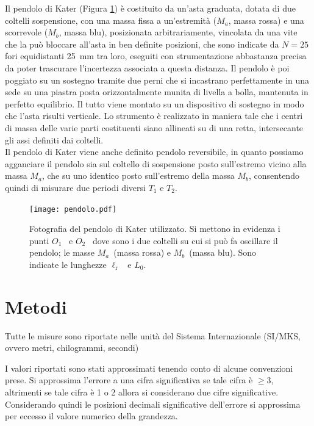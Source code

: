 \documentclass[italian, a4paper, 10pt, twocolumn]{../../style/lab_unige}
\newcommand{\reffig}[1]{Figura {\ref{#1}}}%
\newcommand{\Oi}{$O_1$}
\newcommand{\Oii}{$O_2$}
\newcommand{\lr}{$\ell_{\text{r}}$}
\newcommand{\Ti}[1]{$T_{#1}$}
\newcommand{\Ma}{$M_a$}
\newcommand{\Mb}{$M_b$}
\begin{document}
    Il pendolo di Kater (\reffig{figure:pendolo}) è costituito da un'asta graduata, dotata di due coltelli sospensione, con una massa fissa a un'estremità (\Ma, massa rossa) e una scorrevole (\Mb, massa blu), posizionata arbitrariamente, vincolata da una vite che la può bloccare all'asta in ben definite posizioni, che sono indicate da $N=25$ fori equidistanti 25~mm tra loro, eseguiti con strumentazione abbastanza precisa da poter trascurare l'incertezza associata a questa distanza. Il pendolo è poi poggiato su un sostegno tramite due perni che si incastrano perfettamente in una sede su una piastra posta orizzontalmente munita di livella a bolla, mantenuta in perfetto equilibrio. Il tutto viene montato su un dispositivo di sostegno in modo che l'asta risulti verticale. Lo strumento è realizzato in maniera tale che i centri di massa delle varie parti costituenti siano allineati su di una retta, intersecante gli assi definiti dai coltelli.\\
    Il pendolo di Kater viene anche definito pendolo reversibile, in quanto possiamo agganciare il pendolo sia sul coltello di sospensione posto sull'estremo vicino alla massa \Ma, che su uno identico posto sull'estremo della massa \Mb, consentendo quindi di misurare due periodi diversi \Ti{1} e \Ti{2}. 

    \begin{figure}[h!]
        \centering
        \texttt{[image: pendolo.pdf]}
        \caption{Fotografia del pendolo di Kater utilizzato. Si mettono in evidenza i punti \Oi~ e \Oii~ dove sono i due coltelli su cui si può fa oscillare il pendolo; le masse \Ma~(massa rossa) e \Mb~(massa blu). Sono indicate le lunghezze \lr~ e $L_0$.}
        \label{figure:pendolo}
    \end{figure}

    \section{Metodi}
    \label{section:methods}
    Tutte le misure sono riportate nelle unità del Sistema Internazionale (SI/MKS, ovvero metri, chilogrammi, secondi)
    
    I valori riportati sono stati approssimati tenendo conto di alcune convenzioni prese. Si approssima l'errore a una cifra significativa se tale cifra è $\geqslant3$, altrimenti se tale cifra è 1 o 2 allora si considerano due cifre significative. Considerando quindi le posizioni decimali significative dell'errore si approssima per eccesso il valore numerico della grandezza.\\
\end{document}
